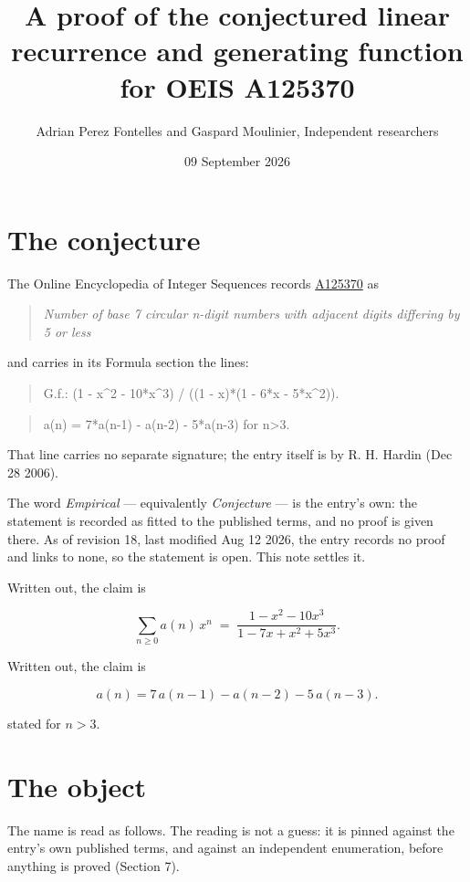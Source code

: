 \documentclass[11pt]{article}
\title{A proof of the conjectured linear recurrence and generating function for OEIS A125370}
\author{Adrian Perez Fontelles and Gaspard Moulinier, Independent researchers}
\date{09 September 2026}
\theoremstyle{definition}
\begin{document}
\maketitle
\section{The conjecture}

The Online Encyclopedia of Integer Sequences records \href{https://oeis.org/A125370}{A125370} as

\begin{quote}\itshape Number of base 7 circular n-digit numbers with adjacent digits differing by 5 or less\end{quote}

and carries in its Formula section the lines:

\begin{quote}\ttfamily G.f.: (1 - x\textasciicircum{}2 - 10*x\textasciicircum{}3) / ((1 - x)*(1 - 6*x - 5*x\textasciicircum{}2)).\end{quote}

\begin{quote}\ttfamily a(n) = 7*a(n-1) - a(n-2) - 5*a(n-3) for n>3.\end{quote}

That line carries no separate signature; the entry itself is by R. H. Hardin (Dec 28 2006).

The word {\itshape Empirical} --- equivalently {\itshape Conjecture} --- is the entry's own: the statement is recorded as fitted to the published terms, and no proof is given there. As of revision 18, last modified Aug 12 2026, the entry records no proof and links to none, so the statement is open. This note settles it.

Written out, the claim is

\[\sum_{n \ge 0} a(n)\,x^n \;=\; \frac{1 - x^{2} - 10x^{3}}{1 - 7x + x^{2} + 5x^{3}}.\]

Written out, the claim is

\[a(n) = 7\,a(n-1) - a(n-2) - 5\,a(n-3).\]

stated for $n > 3$.

\section{The object}

The name is read as follows. The reading is not a guess: it is pinned against the entry's own published terms, and against an independent enumeration, before anything is proved (Section 7).
\end{document}
